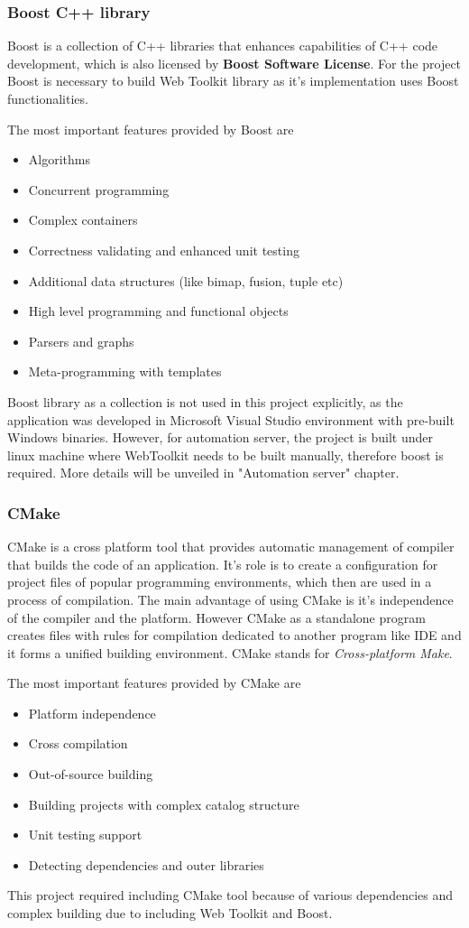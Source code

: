 \documentclass[a4paper,12pt]{article}
\newcommand\tab[1][1cm]{\hspace*{#1}}
\begin{document}
{{}

\subsubsection*{Boost C++ library}
{
\tab Boost is a collection of C++ libraries that enhances capabilities of C++ code development, which is also licensed by \textbf{Boost Software License}. For the project Boost is necessary to build Web Toolkit library as it's implementation uses Boost functionalities.

\bigskip
The most important features provided by Boost are
\begin{itemize}
	\item Algorithms
	\item Concurrent programming
	\item Complex containers
	\item Correctness validating and enhanced unit testing
	\item Additional data structures (like bimap, fusion, tuple etc)
	\item High level programming and functional objects
	\item Parsers and graphs
	\item Meta-programming with templates
\end{itemize}
	
Boost library as a collection is not used in this project explicitly, as the application was developed in Microsoft Visual Studio environment with pre-built Windows binaries. However, for automation server, the project is built under linux machine where WebToolkit needs to be built manually, therefore boost is required. More details will be unveiled in "Automation server" chapter.
}
\subsubsection*{CMake}
{
\tab CMake is a cross platform tool that provides automatic management of compiler that builds the code of an application. It's role is to create a configuration for project files of popular programming environments, which then are used in a process of compilation. The main advantage of using CMake is it's independence of the compiler and the platform. However CMake as a standalone program creates files with rules for compilation dedicated to another program like IDE and it forms a unified building environment. CMake stands for \textit{Cross-platform Make}.

\bigskip
The most important features provided by CMake are
\begin{itemize}
	\item Platform independence
	\item Cross compilation
	\item Out-of-source building
	\item Building projects with complex catalog structure 
	\item Unit testing support
	\item Detecting dependencies and outer libraries
\end{itemize}
This project required including CMake tool because of various dependencies and complex building due to including Web Toolkit and Boost.  

}}
\end{document}

